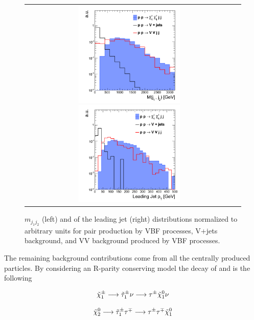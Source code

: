 \begin{figure}[tbh!]
	\centering
	\begin{tabular}{cc}
		\includegraphics[width=0.50\textwidth]{analysis/pics/VBFDiJetMass.png}
		\includegraphics[width=0.50\textwidth]{analysis/pics/VBFFirstLeadingJetPt.png} 		
	\end{tabular}
	\caption{\ensuremath{m_{j_{1}j_{2}}} (left) and \pt of the leading jet (right) distributions normalized to arbitrary units for \charginopm \charginopm pair production by VBF processes, V+jets background, and VV background produced by VBF processes.}
	\label{fig:VBF_mjj_ptj1}
\end{figure}


The remaining background contributions come from all the centrally produced particles. By considering an R-parity conserving model the decay of \charginopm and \neutralinotwo is the following

\begin{equation}
 \tilde{\chi}^{\pm}_{1} \longrightarrow \tilde{\tau}_{1}^{\pm} \nu \longrightarrow \tau^{\pm} \tilde{\chi}^{0}_{1} \nu
\end{equation}

\begin{equation}
\tilde{\chi}^{0}_{2} \longrightarrow \tilde{\tau}_{1}^{\pm} \tau^{\mp} \longrightarrow \tau^{\pm} \tau^{\mp} \tilde{\chi}^{0}_{1}
\end{equation}

